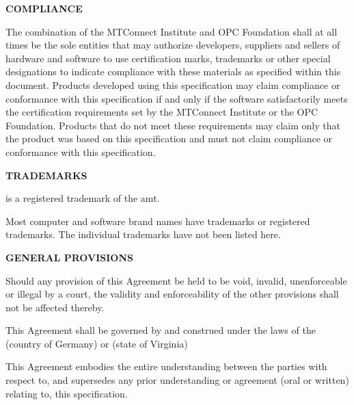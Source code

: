 \textbf{COMPLIANCE}

The combination of the MTConnect Institute and OPC Foundation shall at all times be the sole entities that may authorize developers, suppliers and sellers of hardware and software to use certification marks, trademarks or other special designations to indicate compliance with these materials as specified within this document. Products developed using this specification may claim compliance or conformance with this specification if and only if the software satisfactorily meets the certification requirements set by the MTConnect Institute or the OPC Foundation. Products that do not meet these requirements may claim only that the product was based on this specification and must not claim compliance or conformance with this specification. 

\textbf{TRADEMARKS}

\mtconnect is a registered trademark of the \gls{amt}.

Most computer and software brand names have trademarks or registered trademarks. The individual trademarks have not been listed here.

\textbf{GENERAL PROVISIONS}

Should any provision of this Agreement be held to be void, invalid, unenforceable or illegal by a court, the validity and enforceability of the other provisions shall not be affected thereby. 

This Agreement shall be governed by and construed under the laws of the {\color{red} (country of Germany) or (state of Virginia)}

This Agreement embodies the entire understanding between the parties with respect to, and supersedes any prior understanding or agreement (oral or written) relating to, this specification.


\clearpage

